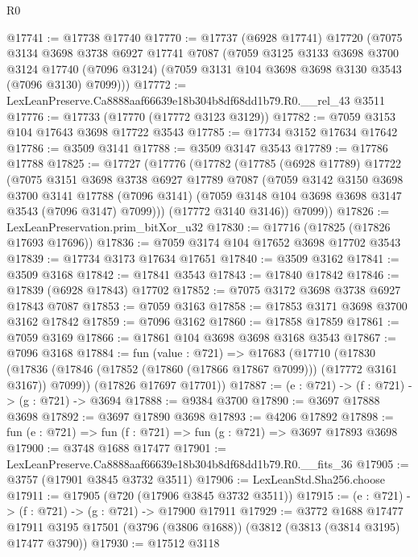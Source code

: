 \begin{lexlean}{R0}
\begin{coremodule}
@17741 := @17738 @17740
@17770 := @17737
    (@6928 @17741)
    @17720
    (@7075
      @3134
      @3698
      @3738
      @6927
      @17741
      @7087
      (@7059
        @3125
        @3133
        @3698
        @3700
        @3124
        @17740
        (@7096 @3124)
        (@7059 @3131 @104 @3698 @3698 @3130 @3543 (@7096 @3130) @7099)))
@17772 := LexLeanPreserve.Ca8888aaf66639e18b304b8df68dd1b79.R0.__rel_43 @3511
@17776 := @17733 (@17770 (@17772 @3123 @3129))
@17782 := @7059 @3153 @104 @17643 @3698 @17722 @3543
@17785 := @17734 @3152 @17634 @17642
@17786 := @3509 @3141
@17788 := @3509 @3147 @3543
@17789 := @17786 @17788
@17825 := @17727
    (@17776
      (@17782
        (@17785
          (@6928 @17789)
          @17722
          (@7075
            @3151
            @3698
            @3738
            @6927
            @17789
            @7087
            (@7059
              @3142
              @3150
              @3698
              @3700
              @3141
              @17788
              (@7096 @3141)
              (@7059 @3148 @104 @3698 @3698 @3147 @3543 (@7096 @3147) @7099)))
          (@17772 @3140 @3146))
        @7099))
@17826 := LexLeanPreservation.prim_bitXor_u32
@17830 := @17716 (@17825 (@17826 @17693 @17696))
@17836 := @7059 @3174 @104 @17652 @3698 @17702 @3543
@17839 := @17734 @3173 @17634 @17651
@17840 := @3509 @3162
@17841 := @3509 @3168
@17842 := @17841 @3543
@17843 := @17840 @17842
@17846 := @17839 (@6928 @17843) @17702
@17852 := @7075 @3172 @3698 @3738 @6927 @17843 @7087
@17853 := @7059 @3163
@17858 := @17853 @3171 @3698 @3700 @3162 @17842
@17859 := @7096 @3162
@17860 := @17858 @17859
@17861 := @7059 @3169
@17866 := @17861 @104 @3698 @3698 @3168 @3543
@17867 := @7096 @3168
@17884 := fun (value : @721) =>
  @17683
    (@17710
      (@17830 (@17836 (@17846 (@17852 (@17860 (@17866 @17867 @7099))) (@17772 @3161 @3167)) @7099))
      (@17826 @17697 @17701))
@17887 := (e : @721) -> (f : @721) -> (g : @721) -> @3694
@17888 := @9384 @3700
@17890 := @3697 @17888 @3698
@17892 := @3697 @17890 @3698
@17893 := @4206 @17892
@17898 := fun (e : @721) => fun (f : @721) => fun (g : @721) => @3697 @17893 @3698
@17900 := @3748 @1688 @17477
@17901 := LexLeanPreserve.Ca8888aaf66639e18b304b8df68dd1b79.R0.__fits_36
@17905 := @3757 (@17901 @3845 @3732 @3511)
@17906 := LexLeanStd.Sha256.choose
@17911 := @17905 (@720 (@17906 @3845 @3732 @3511))
@17915 := (e : @721) -> (f : @721) -> (g : @721) -> @17900 @17911
@17929 := @3772
    @1688
    @17477
    @17911
    @3195
    @17501
    (@3796 (@3806 @1688))
    (@3812 (@3813 (@3814 @3195) @17477 @3790))
@17930 := @17512 @3118

\end{coremodule}
\end{lexlean}
